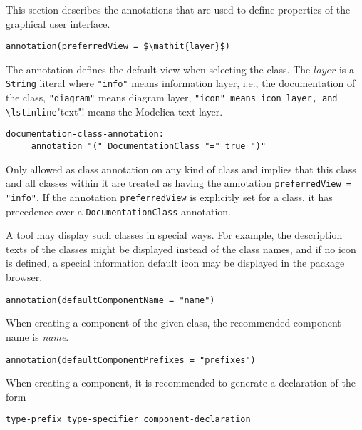 This section describes the annotations that are used to define properties of the graphical user interface.

\begin{lstlisting}[language=modelica]
annotation(preferredView = $\mathit{layer}$)
\end{lstlisting}

The  annotation defines the default view when selecting the class.
The $\mathit{layer}$ is a \lstinline!String! literal where \lstinline!"info"! means information layer, i.e., the documentation of the class, \lstinline!"diagram"! means diagram layer, \lstinline!"icon" means icon layer, and \lstinline!"text"! means the Modelica text layer.

\begin{lstlisting}[language=grammar]
  documentation-class-annotation:
     annotation "(" DocumentationClass "=" true ")"
\end{lstlisting}%

Only allowed as class annotation on any kind of class and implies that this class and all classes within it are treated as having the annotation \lstinline!preferredView = "info"!.
If the annotation \lstinline!preferredView! is explicitly set for a class, it has precedence over a \lstinline!DocumentationClass! annotation.

\begin{nonnormative}
A tool may display such classes in special ways.  For example, the description texts of the classes might be displayed instead
of the class names, and if no icon is defined, a special information default icon may be displayed in the package browser.
\end{nonnormative}

\begin{lstlisting}[language=modelica]
 annotation(defaultComponentName = "name")
\end{lstlisting}%

When creating a component of the given class, the recommended component name is \emph{name}.

\begin{lstlisting}[language=modelica]
annotation(defaultComponentPrefixes = "prefixes")
\end{lstlisting}%

When creating a component, it is recommended to generate a declaration of the form
\begin{lstlisting}[language=grammar]
type-prefix type-specifier component-declaration
\end{lstlisting}

